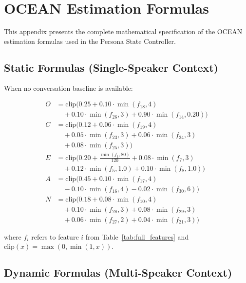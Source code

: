 \documentclass[12pt, a4paper]{report}
\begin{document}
\chapter{OCEAN Estimation Formulas}
\label{app:scoring}

This appendix presents the complete mathematical specification of the OCEAN estimation formulas used in the Persona State Controller.

\section{Static Formulas (Single-Speaker Context)}

When no conversation baseline is available:

\begin{align}
    O &= \text{clip}\Big(0.25 + 0.10 \cdot \min(f_{18}, 4) \nonumber \\
      &\quad + 0.10 \cdot \min(f_{26}, 3) + 0.90 \cdot \min(f_{14}, 0.20)\Big) \\[4pt]
    C &= \text{clip}\Big(0.12 + 0.06 \cdot \min(f_{19}, 4) \nonumber \\
      &\quad + 0.05 \cdot \min(f_{23}, 3) + 0.06 \cdot \min(f_{24}, 3) \nonumber \\
      &\quad + 0.08 \cdot \min(f_{25}, 3)\Big) \\[4pt]
    E &= \text{clip}\Big(0.20 + \frac{\min(f_1, 80)}{120} + 0.08 \cdot \min(f_7, 3) \nonumber \\
      &\quad + 0.12 \cdot \min(f_5, 1.0) + 0.10 \cdot \min(f_8, 1.0)\Big) \\[4pt]
    A &= \text{clip}\Big(0.45 + 0.10 \cdot \min(f_{17}, 4) \nonumber \\
      &\quad - 0.10 \cdot \min(f_{16}, 4) - 0.02 \cdot \min(f_{30}, 6)\Big) \\[4pt]
    N &= \text{clip}\Big(0.18 + 0.08 \cdot \min(f_{10}, 4) \nonumber \\
      &\quad + 0.10 \cdot \min(f_{28}, 3) + 0.08 \cdot \min(f_{29}, 3) \nonumber \\
      &\quad + 0.06 \cdot \min(f_{27}, 2) + 0.04 \cdot \min(f_{21}, 3)\Big)
\end{align}

\noindent where $f_i$ refers to feature $i$ from Table~\ref{tab:full_features} and $\text{clip}(x) = \max(0, \min(1, x))$.

\section{Dynamic Formulas (Multi-Speaker Context)}
\end{document}
